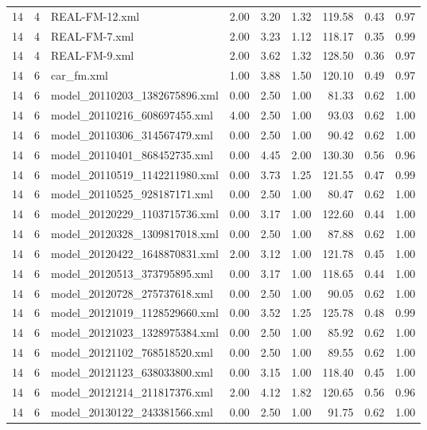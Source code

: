 \begin{table}[ht]
\begin{tabular}{rrlrrrrrr}
   14 &   4 & REAL-FM-12.xml & 2.00 & 3.20 & 1.32 & 119.58 & 0.43 & 0.97 \\ 
   14 &   4 & REAL-FM-7.xml & 2.00 & 3.23 & 1.12 & 118.17 & 0.35 & 0.99 \\ 
   14 &   4 & REAL-FM-9.xml & 2.00 & 3.62 & 1.32 & 128.50 & 0.36 & 0.97 \\ 
   14 &   6 & car\_fm.xml & 1.00 & 3.88 & 1.50 & 120.10 & 0.49 & 0.97 \\ 
   14 &   6 & model\_20110203\_1382675896.xml & 0.00 & 2.50 & 1.00 & 81.33 & 0.62 & 1.00 \\ 
   14 &   6 & model\_20110216\_608697455.xml & 4.00 & 2.50 & 1.00 & 93.03 & 0.62 & 1.00 \\ 
   14 &   6 & model\_20110306\_314567479.xml & 0.00 & 2.50 & 1.00 & 90.42 & 0.62 & 1.00 \\ 
   14 &   6 & model\_20110401\_868452735.xml & 0.00 & 4.45 & 2.00 & 130.30 & 0.56 & 0.96 \\ 
   14 &   6 & model\_20110519\_1142211980.xml & 0.00 & 3.73 & 1.25 & 121.55 & 0.47 & 0.99 \\ 
   14 &   6 & model\_20110525\_928187171.xml & 0.00 & 2.50 & 1.00 & 80.47 & 0.62 & 1.00 \\ 
   14 &   6 & model\_20120229\_1103715736.xml & 0.00 & 3.17 & 1.00 & 122.60 & 0.44 & 1.00 \\ 
   14 &   6 & model\_20120328\_1309817018.xml & 0.00 & 2.50 & 1.00 & 87.88 & 0.62 & 1.00 \\ 
   14 &   6 & model\_20120422\_1648870831.xml & 2.00 & 3.12 & 1.00 & 121.78 & 0.45 & 1.00 \\ 
   14 &   6 & model\_20120513\_373795895.xml & 0.00 & 3.17 & 1.00 & 118.65 & 0.44 & 1.00 \\ 
   14 &   6 & model\_20120728\_275737618.xml & 0.00 & 2.50 & 1.00 & 90.05 & 0.62 & 1.00 \\ 
   14 &   6 & model\_20121019\_1128529660.xml & 0.00 & 3.52 & 1.25 & 125.78 & 0.48 & 0.99 \\ 
   14 &   6 & model\_20121023\_1328975384.xml & 0.00 & 2.50 & 1.00 & 85.92 & 0.62 & 1.00 \\ 
   14 &   6 & model\_20121102\_768518520.xml & 0.00 & 2.50 & 1.00 & 89.55 & 0.62 & 1.00 \\ 
   14 &   6 & model\_20121123\_638033800.xml & 0.00 & 3.15 & 1.00 & 118.40 & 0.45 & 1.00 \\ 
   14 &   6 & model\_20121214\_211817376.xml & 2.00 & 4.12 & 1.82 & 120.65 & 0.56 & 0.96 \\ 
   14 &   6 & model\_20130122\_243381566.xml & 0.00 & 2.50 & 1.00 & 91.75 & 0.62 & 1.00 \\ 

\end{tabular}
\end{table}
